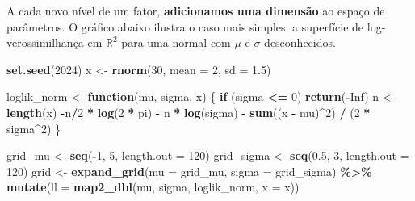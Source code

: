 \documentclass[
]{article}
\newenvironment{Shaded}{\begin{snugshade}}{\end{snugshade}}
\newcommand{\AttributeTok}[1]{\textcolor[rgb]{0.13,0.29,0.53}{#1}}
\newcommand{\ConstantTok}[1]{\textcolor[rgb]{0.56,0.35,0.01}{#1}}
\newcommand{\ControlFlowTok}[1]{\textcolor[rgb]{0.13,0.29,0.53}{\textbf{#1}}}
\newcommand{\DecValTok}[1]{\textcolor[rgb]{0.00,0.00,0.81}{#1}}
\newcommand{\FloatTok}[1]{\textcolor[rgb]{0.00,0.00,0.81}{#1}}
\newcommand{\FunctionTok}[1]{\textcolor[rgb]{0.13,0.29,0.53}{\textbf{#1}}}
\newcommand{\NormalTok}[1]{#1}
\newcommand{\OtherTok}[1]{\textcolor[rgb]{0.56,0.35,0.01}{#1}}
\newcommand{\SpecialCharTok}[1]{\textcolor[rgb]{0.81,0.36,0.00}{\textbf{#1}}}
\begin{document}
A cada novo nível de um fator, \textbf{adicionamos uma dimensão} ao
espaço de parâmetros. O gráfico abaixo ilustra o caso mais simples: a
superfície de log-verossimilhança em \(\mathbb{R}^2\) para uma normal
com \(\mu\) e \(\sigma\) desconhecidos.

\begin{Shaded}
\begin{Highlighting}[]
\FunctionTok{set.seed}\NormalTok{(}\DecValTok{2024}\NormalTok{)}
\NormalTok{x }\OtherTok{\textless{}{-}} \FunctionTok{rnorm}\NormalTok{(}\DecValTok{30}\NormalTok{, }\AttributeTok{mean =} \DecValTok{2}\NormalTok{, }\AttributeTok{sd =} \FloatTok{1.5}\NormalTok{)}

\NormalTok{loglik\_norm }\OtherTok{\textless{}{-}} \ControlFlowTok{function}\NormalTok{(mu, sigma, x) \{}
  \ControlFlowTok{if}\NormalTok{ (sigma }\SpecialCharTok{\textless{}=} \DecValTok{0}\NormalTok{) }\FunctionTok{return}\NormalTok{(}\SpecialCharTok{{-}}\ConstantTok{Inf}\NormalTok{)}
\NormalTok{  n }\OtherTok{\textless{}{-}} \FunctionTok{length}\NormalTok{(x)}
  \SpecialCharTok{{-}}\NormalTok{n}\SpecialCharTok{/}\DecValTok{2} \SpecialCharTok{*} \FunctionTok{log}\NormalTok{(}\DecValTok{2} \SpecialCharTok{*}\NormalTok{ pi) }\SpecialCharTok{{-}}\NormalTok{ n }\SpecialCharTok{*} \FunctionTok{log}\NormalTok{(sigma) }\SpecialCharTok{{-}} \FunctionTok{sum}\NormalTok{((x }\SpecialCharTok{{-}}\NormalTok{ mu)}\SpecialCharTok{\^{}}\DecValTok{2}\NormalTok{) }\SpecialCharTok{/}\NormalTok{ (}\DecValTok{2} \SpecialCharTok{*}\NormalTok{ sigma}\SpecialCharTok{\^{}}\DecValTok{2}\NormalTok{)}
\NormalTok{\}}

\NormalTok{grid\_mu    }\OtherTok{\textless{}{-}} \FunctionTok{seq}\NormalTok{(}\SpecialCharTok{{-}}\DecValTok{1}\NormalTok{, }\DecValTok{5}\NormalTok{, }\AttributeTok{length.out =} \DecValTok{120}\NormalTok{)}
\NormalTok{grid\_sigma }\OtherTok{\textless{}{-}} \FunctionTok{seq}\NormalTok{(}\FloatTok{0.5}\NormalTok{, }\DecValTok{3}\NormalTok{, }\AttributeTok{length.out =} \DecValTok{120}\NormalTok{)}
\NormalTok{grid }\OtherTok{\textless{}{-}} \FunctionTok{expand\_grid}\NormalTok{(}\AttributeTok{mu =}\NormalTok{ grid\_mu, }\AttributeTok{sigma =}\NormalTok{ grid\_sigma) }\SpecialCharTok{\%\textgreater{}\%}
  \FunctionTok{mutate}\NormalTok{(}\AttributeTok{ll =} \FunctionTok{map2\_dbl}\NormalTok{(mu, sigma, loglik\_norm, }\AttributeTok{x =}\NormalTok{ x))}


\end{Highlighting}
\end{Shaded}
\end{document}
